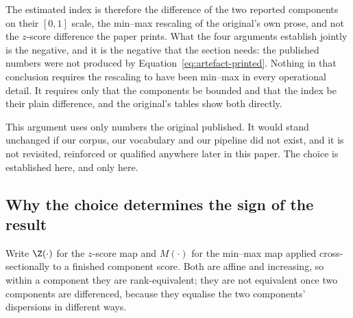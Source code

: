 The estimated index is therefore the difference of the two reported components
on their $[0,1]$ scale, the min--max rescaling of the original's own prose, and
not the $z$-score difference the paper prints. What the four arguments establish
jointly is the negative, and it is the negative that the section needs: the
published numbers were not produced by Equation~\eqref{eq:artefact-printed}.
Nothing in that conclusion requires the rescaling to have been min--max in every
operational detail. It requires only that the components be bounded and that the
index be their plain difference, and the original's tables show both directly.

This argument uses only numbers the original published. It would stand unchanged
if our corpus, our vocabulary and our pipeline did not exist, and it is not
revisited, reinforced or qualified anywhere later in this paper. The choice is
established here, and only here.

\subsection{Why the choice determines the sign of the result}
\label{sec:artefact-why}

Write $\Z(\cdot)$ for the $z$-score map and $M(\cdot)$ for the min--max map
applied cross-sectionally to a finished component score. Both are affine and
increasing, so within a component they are rank-equivalent; they are not
equivalent once two components are differenced, because they equalise the two
components' dispersions in different ways.

